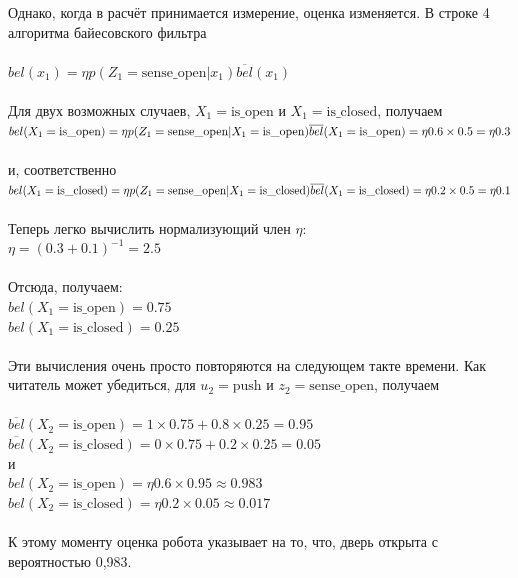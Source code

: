 \documentclass[10pt,a4paper]{article}
\begin{document}
 Однако, когда в расчёт принимается измерение, оценка изменяется. В строке 4 алгоритма байесовского фильтра\\
 {}\\
 $bel(x_1) =\eta p(Z_1 =\mbox{sense\_open}  | x_1) \overline{bel}(x_1)$\\
 {}\\
 Для двух возможных случаев, $X_1 =\mbox{is\_open}$ и $X_1 =\mbox{is\_closed}$, получаем\\
 $bel(X_1 =\mbox{is\_open} )\\
 =\eta p(Z_1 =\mbox{sense\_open}  | X_1 =\mbox{is\_open} ) \overline{bel}(X_1 =\mbox{is\_open} )\\
 = \eta 0.6\times0.5 =\eta 0.3$\\
 {}\\
 и, соответственно\\
 $bel(X_1 =\mbox{is\_closed} )\\
 =\eta p(Z_1 =\mbox{sense\_open}  | X_1 =\mbox{is\_closed} ) \overline{bel}(X_1 =\mbox{is\_closed} )\\
 = \eta 0.2\times0.5 = \eta 0.1$\\
 {}\\
 Теперь легко вычислить нормализующий член $\eta$:\\
 $\eta = (0.3 + 0.1)^{-1} = 2.5$\\
 {}\\ 
 Отсюда, получаем:\\
 $bel(X_1 =\mbox{is\_open} ) = 0.75$\\
 $bel(X_1 =\mbox{is\_closed}) = 0.25$\\
 {}\\
 Эти вычисления очень просто повторяются на следующем такте времени. Как читатель может убедиться, для $u_2 =\mbox{push}$  и $z_2 =\mbox{sense\_open}$, получаем\\
 {}\\
 $\overline{bel}(X_2 =\mbox{is\_open} ) = 1\times0.75 + 0.8\times0.25 = 0.95$\\
 $\overline{bel}(X_2 =\mbox{is\_closed} ) = 0\times0.75 + 0.2\times0.25 = 0.05$\\
 и\\
 $bel(X_2 =\mbox{is\_open} ) =\eta 0.6\times0.95\approx0.983$\\
 $bel(X_2 =\mbox{is\_closed} ) =\eta0.2\times0.05\approx0.017$\\
 {}\\
 К этому моменту оценка робота указывает на то, что, дверь открыта с вероятностью 0,983.
 
\end{document}
